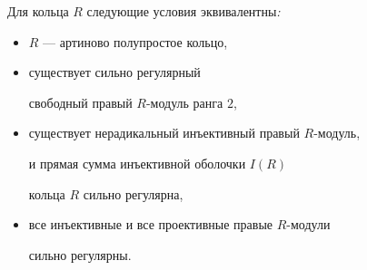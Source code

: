 \begin{thm} Для кольца $R$ следующие условия эквивалентны{\em :}


\begin{itemize}


\item[(1)] $R$ --- артиново полупростое кольцо,


\item[(2)] существует сильно регулярный


свободный правый $R$-модуль ранга $2$,


\item[(3)] существует нерадикальный инъективный правый $R$-модуль,


и прямая сумма инъективной оболочки $I(R)$


кольца $R$ сильно регулярна,


\item[(4)] все инъективные и все проективные правые $R$-модули


сильно регулярны.


\end{itemize}


\end{thm}





